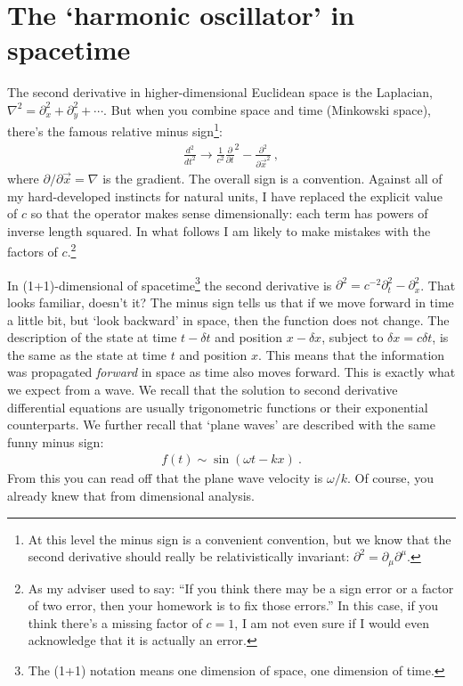\documentclass[
  11pt,
	colorful,
	raggedright,
]{tufte-style-thesis-flip}
\begin{document}
\section{The `harmonic oscillator' in spacetime}
The second derivative in higher-dimensional Euclidean space is the Laplacian, $\nabla^2= \partial_x^2 + \partial_y^2 +\cdots$. But when you combine space and time (Minkowski space), there's the famous relative minus sign\footnote{At this level the minus sign is a convenient convention, but we know that the second derivative should really be relativistically invariant: $\partial^2 = \partial_\mu \partial^\mu$.}:
\begin{align}
  \frac{d^2}{dt^2}
  \to 
  \frac{1}{c^2}
  \frac{\partial}{\partial t}^2
  -
  \frac{\partial^2}
  {\partial \vec x^2} \ ,
\end{align}
where $\partial/\partial\vec x = \nabla$ is the gradient. The overall sign is a convention. Against all of my hard-developed instincts for natural units, I have replaced the explicit value of $c$ so that the operator makes sense dimensionally: each term has powers of inverse length squared. In what follows I am likely to make mistakes with the factors of $c$.\footnote{As my adviser used to say: ``If you think there may be a sign error or a factor of two error, then your homework is to fix those errors.'' In this case, if you think there's a missing factor of $c=1$, I am not even sure if I would even acknowledge that it is actually an error.} 

In (1+1)-dimensional of spacetime\footnote{The (1+1) notation means one dimension of space, one dimension of time.} the second derivative is $\partial^2 = c^{-2} \partial_t^2 - \partial_x^2$. That looks familiar, doesn't it? The minus sign tells us that if we move forward in time a little bit, but `look backward' in space, then the function does not change. The description of the state at time $t-\delta t$ and position $x-\delta x$, subject to $\delta x = c\delta t$, is the same as the state at time $t$ and position $x$. 
%
This means that the information was propagated \emph{forward} in space as time also moves forward. This is exactly what we expect from a wave. We recall that the solution to second derivative differential equations are usually trigonometric functions or their exponential counterparts. We further recall that `plane waves' are described with the same funny minus sign:
\begin{align}
  f(t) \sim \sin (\omega t - kx) \ .
  \label{eq:plane:wave}
\end{align}
From this you can read off that the plane wave velocity is $\omega/k$. Of course, you already knew that from dimensional analysis. 
\end{document}
